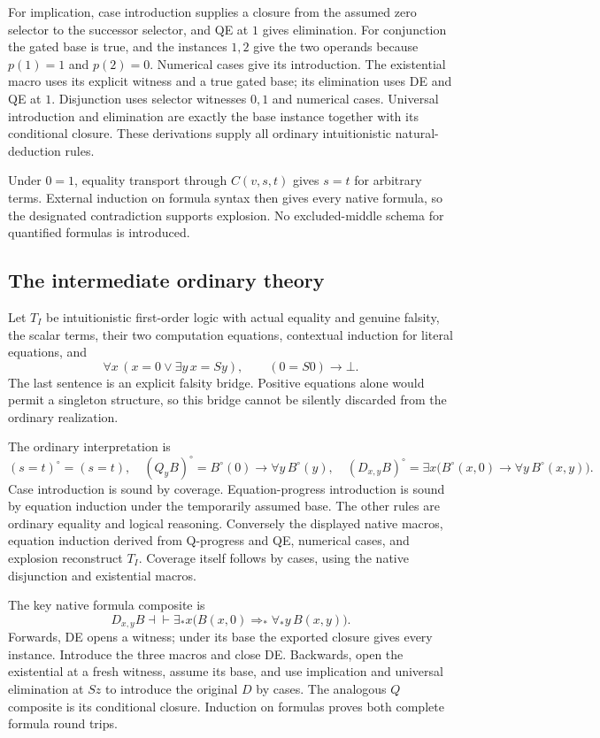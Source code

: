 For implication, case introduction supplies a closure from the assumed
zero selector to the successor selector, and QE at $1$ gives elimination.
For conjunction the gated base is true, and the instances $1,2$ give the
two operands because $p(1)=1$ and $p(2)=0$. Numerical cases give its
introduction. The existential macro uses its explicit witness and a true
gated base; its elimination uses DE and QE at $1$. Disjunction uses
selector witnesses $0,1$ and numerical cases. Universal introduction
and elimination are exactly the base instance together with its
conditional closure. These derivations supply all ordinary intuitionistic
natural-deduction rules.

Under $0=1$, equality transport through $C(v,s,t)$ gives $s=t$ for
arbitrary terms. External induction on formula syntax then gives
every native formula, so the designated contradiction supports explosion.
No excluded-middle schema for quantified formulas is introduced.

\subsection{The intermediate ordinary theory}

Let $T_I$ be intuitionistic first-order logic with actual equality and
genuine falsity, the scalar terms, their two computation equations,
contextual induction for literal equations, and
\[
 \forall x\,(x=0\vee\exists y\,x=Sy),
 \qquad (0=S0)\to\bot.
\]
The last sentence is an explicit falsity bridge. Positive equations alone
would permit a singleton structure, so this bridge cannot be silently
discarded from the ordinary realization.

The ordinary interpretation is
\[
 (s=t)^\circ=(s=t),\quad
 (Q_yB)^\circ=B^\circ(0)\to\forall y\,B^\circ(y),\quad
 (D_{x,y}B)^\circ=
 \exists x\bigl(B^\circ(x,0)\to\forall y\,B^\circ(x,y)\bigr).
\]
Case introduction is sound by coverage. Equation-progress introduction
is sound by equation induction under the temporarily assumed base.
The other rules are ordinary equality and logical reasoning.
Conversely the displayed native macros, equation induction derived
from Q-progress and QE, numerical cases, and explosion reconstruct
$T_I$. Coverage itself follows by cases, using the native disjunction
and existential macros.

The key native formula composite is
\[
 D_{x,y}B
 \dashv\vdash
 \exists_*x\bigl(B(x,0)\Rightarrow_*\forall_*y\,B(x,y)\bigr).
\]
Forwards, DE opens a witness; under its base the exported closure
gives every instance. Introduce the three macros and close DE.
Backwards, open the existential at a fresh witness, assume its base,
and use implication and universal elimination at $Sz$ to introduce
the original $D$ by cases. The analogous $Q$ composite is its conditional
closure. Induction on formulas proves both complete formula round trips.

